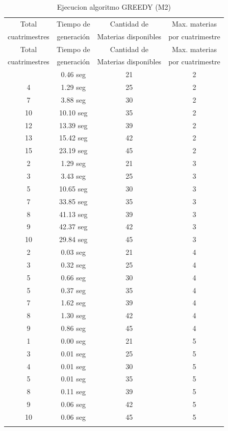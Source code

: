 \documentclass[a4paper]{article}
\begin{document}
\begin{longtable}{| c | c | c | c |}
\hline
Total   & Tiempo de & Cantidad de & Max. materias  \\
cuatrimestres &  generación &  Materias disponibles & por cuatrimestre \\
\hline \hline
\endfirsthead
\hline
Total   & Tiempo de & Cantidad de & Max. materias  \\
cuatrimestres &  generación &  Materias disponibles & por cuatrimestre \\
\hline \hline
\endhead
\endfoot
\endlastfoot
2 & 0.46 seg & 21 & 2\\
\hline
4 & 1.29 seg & 25 & 2\\
\hline
7 & 3.88 seg & 30 & 2\\
\hline
10 & 10.10 seg & 35 & 2\\
\hline
12 & 13.39 seg & 39 & 2\\
\hline
13 & 15.42 seg & 42 & 2\\
\hline
15 & 23.19 seg & 45 & 2\\
\hline
2 & 1.29 seg & 21 & 3\\
\hline
3 & 3.43 seg & 25 & 3\\
\hline
5 & 10.65 seg & 30 & 3\\
\hline
7 & 33.85 seg & 35 & 3\\
\hline
8 & 41.13 seg & 39 & 3\\
\hline
9 & 42.37 seg & 42 & 3\\
\hline
10 & 29.84 seg & 45 & 3\\
\hline
2 & 0.03 seg & 21 & 4\\
\hline
3 & 0.32 seg & 25 & 4\\
\hline
5 & 0.66 seg & 30 & 4\\
\hline
5 & 0.37 seg & 35 & 4\\
\hline
7 & 1.62 seg & 39 & 4\\
\hline
8 & 1.30 seg & 42 & 4\\
\hline
9 & 0.86 seg & 45 & 4\\
\hline
1 & 0.00 seg & 21 & 5\\
\hline
3 & 0.01 seg & 25 & 5\\
\hline
4 & 0.01 seg & 30 & 5\\
\hline
5 & 0.01 seg & 35 & 5\\
\hline
8 & 0.11 seg & 39 & 5\\
\hline
9 & 0.06 seg & 42 & 5\\
\hline
10 & 0.06 seg & 45 & 5\\
\hline
\caption{Ejecucion algoritmo GREEDY (M2)}
\end{longtable}
\end{document}
